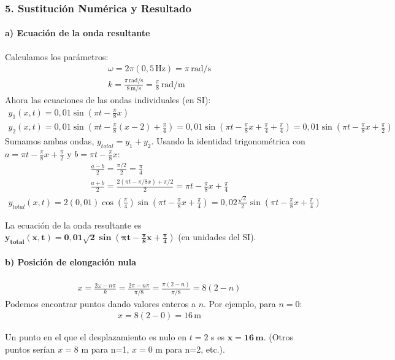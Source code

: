 \subsubsection*{5. Sustitución Numérica y Resultado}
\paragraph*{a) Ecuación de la onda resultante}
Calculamos los parámetros:
\begin{gather}
    \omega = 2\pi (0,5\,\text{Hz}) = \pi\,\text{rad/s} \\
    k = \frac{\pi\,\text{rad/s}}{8\,\text{m/s}} = \frac{\pi}{8}\,\text{rad/m}
\end{gather}
Ahora las ecuaciones de las ondas individuales (en SI):
\begin{gather}
    y_1(x,t) = 0,01\sin(\pi t - \frac{\pi}{8}x) \\
    y_2(x,t) = 0,01\sin(\pi t - \frac{\pi}{8}(x-2) + \frac{\pi}{4}) = 0,01\sin(\pi t - \frac{\pi}{8}x + \frac{\pi}{4} + \frac{\pi}{4}) = 0,01\sin(\pi t - \frac{\pi}{8}x + \frac{\pi}{2})
\end{gather}
Sumamos ambas ondas, $y_{total} = y_1+y_2$. Usando la identidad trigonométrica con $a = \pi t - \frac{\pi}{8}x + \frac{\pi}{2}$ y $b = \pi t - \frac{\pi}{8}x$:
\begin{gather}
    \frac{a-b}{2} = \frac{\pi/2}{2} = \frac{\pi}{4} \\
    \frac{a+b}{2} = \frac{2(\pi t - \pi/8 x) + \pi/2}{2} = \pi t - \frac{\pi}{8}x + \frac{\pi}{4}
\end{gather}
\begin{gather}
    y_{total}(x,t) = 2(0,01)\cos(\frac{\pi}{4})\sin(\pi t - \frac{\pi}{8}x + \frac{\pi}{4}) = 0,02 \frac{\sqrt{2}}{2} \sin(\pi t - \frac{\pi}{8}x + \frac{\pi}{4})
\end{gather}
\begin{cajaresultado}
La ecuación de la onda resultante es $\boldsymbol{y_{total}(x,t) = 0,01\sqrt{2} \sin(\pi t - \frac{\pi}{8}x + \frac{\pi}{4})}$ (en unidades del SI).
\end{cajaresultado}

\paragraph*{b) Posición de elongación nula}
\begin{gather}
    x = \frac{2\omega - n\pi}{k} = \frac{2\pi - n\pi}{\pi/8} = \frac{\pi(2-n)}{\pi/8} = 8(2-n)
\end{gather}
Podemos encontrar puntos dando valores enteros a $n$. Por ejemplo, para $n=0$:
\begin{gather}
    x = 8(2-0) = 16\,\text{m}
\end{gather}
\begin{cajaresultado}
Un punto en el que el desplazamiento es nulo en $t=2$ s es $\boldsymbol{x = 16\,\textbf{m}}$. (Otros puntos serían $x=8$ m para n=1, $x=0$ m para n=2, etc.).
\end{cajaresultado}

